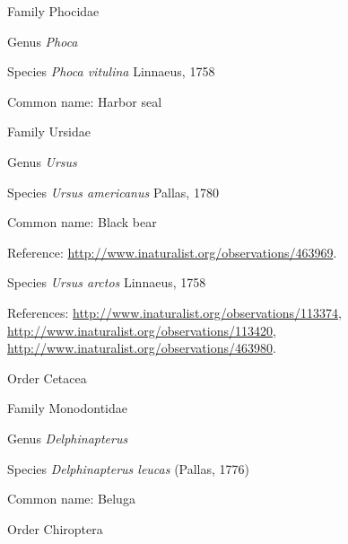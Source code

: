 \documentclass[9pt, article]{memoir}
\begin{document}
\begin{multicols}{2}
\vspace{6pt}\noindent\hspace{24pt}Family Phocidae


\vspace{6pt}\noindent\hspace{30pt}Genus \textit{Phoca}


\vspace{6pt}\noindent\hspace{36pt}Species \textit{Phoca vitulina} Linnaeus, 1758


Common name: Harbor seal

\vspace{6pt}\noindent\hspace{24pt}Family Ursidae


\vspace{6pt}\noindent\hspace{30pt}Genus \textit{Ursus}


\vspace{6pt}\noindent\hspace{36pt}Species \textit{Ursus americanus} Pallas, 1780


Common name: Black bear

Reference: 
\url{http://www.inaturalist.org/observations/463969}.

\vspace{6pt}\noindent\hspace{36pt}Species \textit{Ursus arctos} Linnaeus, 1758


References: 
\url{http://www.inaturalist.org/observations/113374}, 
\url{http://www.inaturalist.org/observations/113420}, 
\url{http://www.inaturalist.org/observations/463980}.

\vspace{6pt}\noindent\hspace{18pt}Order Cetacea


\vspace{6pt}\noindent\hspace{24pt}Family Monodontidae


\vspace{6pt}\noindent\hspace{30pt}Genus \textit{Delphinapterus}


\vspace{6pt}\noindent\hspace{36pt}Species \textit{Delphinapterus leucas} (Pallas, 1776)


Common name: Beluga

\vspace{6pt}\noindent\hspace{18pt}Order Chiroptera



\end{multicols}
\end{document}
